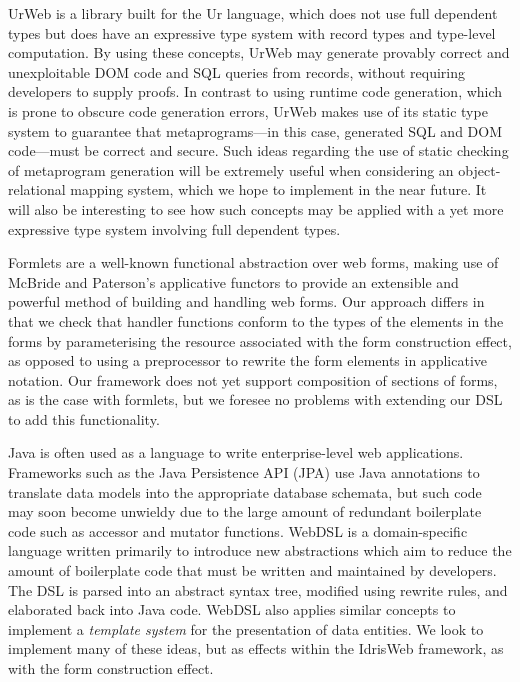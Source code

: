 Ur\/Web \cite{urweb} is a library built for the Ur language, which does not use
full dependent types but does have an expressive type system with 
record types and type-level computation.  By using these concepts,
Ur\/Web may generate provably correct and unexploitable DOM code and SQL
queries from records, without requiring developers to supply proofs.  In
contrast to using runtime code generation, which is prone to obscure code
generation errors, Ur\/Web makes use of its static type system to guarantee
that metaprograms---in this case, generated SQL and DOM code---must be correct
and secure.  Such ideas regarding the use of static checking of metaprogram
generation will be extremely useful when considering an object-relational
mapping system, which we hope to implement in the near future. It will also be
interesting to see how such concepts may be applied with a yet more expressive
type system involving full dependent types.

Formlets \cite{cooper:formlets} are a well-known functional abstraction over web forms, making use of McBride and Paterson's applicative functors \cite{mcbride:applicative} to provide an extensible and powerful method of building and handling web forms. 
Our approach differs in that we check that handler functions conform to the types of the elements in the forms by parameterising the resource associated with the form construction effect, as opposed to using a preprocessor to rewrite the form elements in applicative notation.
Our framework does not yet support composition of sections of forms, as is the case with formlets, but we foresee no problems with extending our DSL to add this functionality.

Java is often used as a language to write enterprise-level web applications. Frameworks such as the Java Persistence API (JPA) \cite{jpa} use Java annotations to translate data models into the appropriate database schemata, but such code may soon become unwieldy due to the large amount of redundant boilerplate code such as accessor and mutator functions. WebDSL \cite{webdsl} is a domain-specific language written primarily to
introduce new abstractions which aim to reduce the amount of boilerplate code
that must be written and maintained by developers. 
The DSL is parsed into an abstract syntax tree, modified using rewrite rules, and elaborated back into Java code. WebDSL also applies similar concepts to implement a \textit{template system} for the presentation of data entities. We look to
implement many of these ideas, but as effects within the IdrisWeb
framework, as with the form construction effect.

